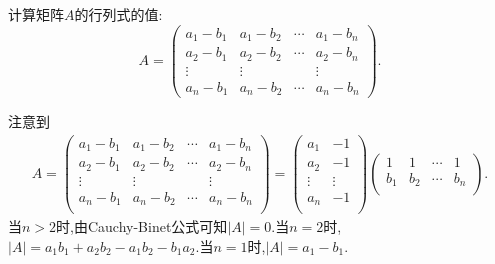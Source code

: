 \documentclass[lang=cn,newtx,10pt,scheme=chinese]{elegantbook}
\begin{document}
\begin{example}
计算矩阵\(A\)的行列式的值:
\[
A = 
\begin{pmatrix}
a_1 - b_1 & a_1 - b_2 & \cdots & a_1 - b_n\\
a_2 - b_1 & a_2 - b_2 & \cdots & a_2 - b_n\\
\vdots & \vdots & & \vdots\\
a_n - b_1 & a_n - b_2 & \cdots & a_n - b_n
\end{pmatrix}.
\]
\end{example}
\begin{solution}
    注意到\begin{align*}
        A=\left( \begin{matrix}
            a_1-b_1&		a_1-b_2&		\cdots&		a_1-b_n\\
            a_2-b_1&		a_2-b_2&		\cdots&		a_2-b_n\\
            \vdots&		\vdots&		&		\vdots\\
            a_n-b_1&		a_n-b_2&		\cdots&		a_n-b_n\\
        \end{matrix} \right) =\left( \begin{matrix}
            a_1&		-1\\
            a_2&		-1\\
            \vdots&		\vdots\\
            a_n&		-1\\
        \end{matrix} \right) \left( \begin{matrix}
            1&		1&		\cdots&		1\\
            b_1&		b_2&		\cdots&		b_n\\
        \end{matrix} \right) .
    \end{align*}
当$n>2$时,由Cauchy-Binet公式可知$\left| A \right|=0$.当$n=2$时,$\left| A \right|=a_1b_1+a_2b_2-a_1b_2-b_1a_2$.当$n=1$时,$\left| A \right|=a_1-b_1$.
\end{solution}
\end{document}
